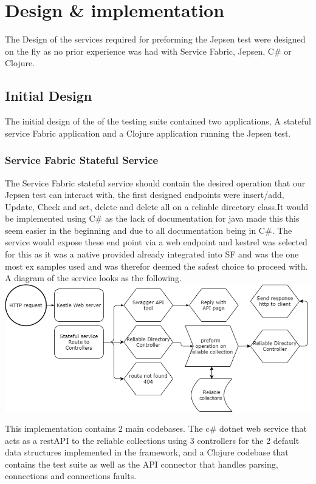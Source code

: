 \documentclass[a4paper,10pt,titlepage]{report}
\begin{document}
\section{Design \& implementation}
The Design of the services required for preforming the Jepsen test were designed on the fly as no prior experience was had with Service Fabric, Jepsen, C\# or Clojure.
\subsection{Initial Design}

The initial design of the of the testing suite contained two applications, A stateful service Fabric application and a Clojure application running the Jepsen test.

\subsubsection{Service Fabric Stateful Service}

The Service Fabric stateful service should contain the desired operation that our Jepsen test can interact with, the first designed endpoints were insert/add, Update, Check and set, delete and delete all on a reliable directory class.It would be implemented using C\# as the lack of documentation for java made this this seem easier in the beginning and due to all documentation being in C\#. The service would expose these end point via a web endpoint and kestrel was selected for this as it was a native provided already integrated into SF and was the one most ex samples used and was therefor deemed the safest choice to proceed with.\\
\vspace{5mm}
A diagram of the service looks as the following. \\
\vspace{5mm}
\includegraphics[scale=0.5]{images/Design_Stateful_service_1.0.drawio.png}

This implementation contains 2 main codebases. The c\# dotnet web service that acts as a restAPI to the reliable collections using 3 controllers for the 2 default data structures implemented in the framework, and a Clojure codebase that contains the test suite as well as the API connector that handles parsing, connections and connections faults.
\end{document}
